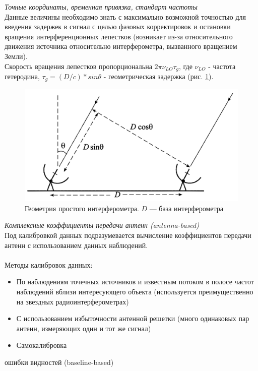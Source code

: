 \begin{list}{-}{\textbf{Аппаратные}}
	\item \textit{Точные координаты, временная привязка, стандарт частоты}\\
	Данные величины необходимо знать с максимально возможной точностью для введения задержек в сигнал с целью фазовых корректировок и остановки вращения интерференционных лепестков (возникает из-за относительного движения источника относительно интерферометра, вызванного вращением Земли). \\
	Скорость вращения лепестков пропорциональна $2\pi \nu_{LO} \tau_g$, где $\nu_{LO}$ - частота гетеродина, $\tau_g = ({D}/{c}) * sin \theta$ - геометрическая задержка (рис. \ref{fig:геометрия интерферометра}).
	\begin{figure}[H]
		\centering
		\includegraphics[scale=0.5]{images/geominterferometr.png}
		\caption{Геометрия простого интерферометра. $D$ — база интерферометра}
		\label{fig:геометрия интерферометра}
	\end{figure}

\end{list}

\begin{list}{-}{\textbf{Калибровка данных}}
	\item \textit{Комплексные коэффициенты передачи антенн (antenna-based)}\\
	Под калибровкой данных подразумевается вычисление коэффициентов передачи антенн с использованием данных наблюдений.\\\\
	Методы калибровок данных:
	\begin{itemize}
		\item По наблюдениям точечных источников и известным потоком в полосе частот наблюдений вблизи интересующего объекта (используется преимущественно на звездных радиоинтерферометрах)
		\item С использованием избыточности антенной решетки (много одинаковых пар антенн, измеряющих один и тот же сигнал)
		\item Самокалибровка
	\end{itemize}

	\item ошибки видностей (baseline-based)
\end{list}

